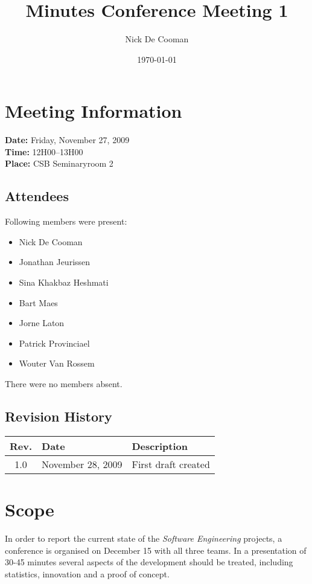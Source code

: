 \documentclass[a4paper, 12pt]{article}
\begin{document}
\title{Minutes Conference Meeting 1}
\author{Nick De Cooman}
\date{\today}

\maketitle	
	\section{Meeting Information}
		\textbf{Date:} Friday, November 27, 2009\\
		\textbf{Time:} 12H00--13H00\\
		\textbf{Place:} CSB Seminaryroom 2\\
		
		\subsection{Attendees}
Following members were present:
			\begin{itemize}
				\item Nick De Cooman
				\item Jonathan Jeurissen
				\item Sina Khakbaz Heshmati
				\item Bart Maes
				\item Jorne Laton
				\item Patrick Provinciael
				\item Wouter Van Rossem
			\end{itemize}
There were no members absent.
			
		\subsection{Revision History}
			\begin{tabular}{c | l | l }
				\textbf{Rev.} & \textbf{Date} & \textbf{Description} \\
				\hline
				1.0 & November 28, 2009 & First draft created \\

			\end{tabular}		

\section{Scope}

In order to report the current state of the \emph{Software Engineering} projects, a conference is organised on December 15 with all three teams. In a presentation of 30-45 minutes several aspects of the development should be treated, including statistics, innovation and a proof of concept. 
\end{document}

